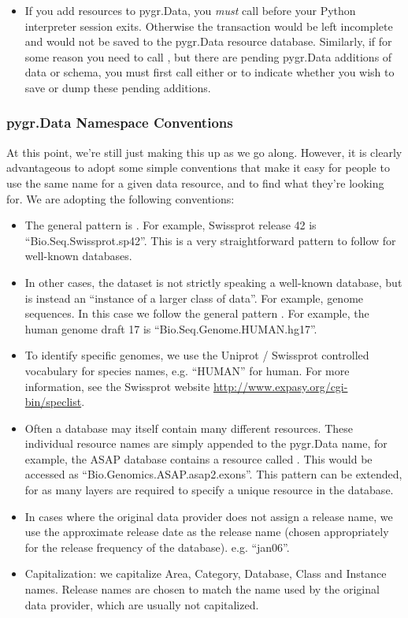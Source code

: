 \documentclass{howto}
\begin{document}
\begin{itemize}
\item If you add resources to pygr.Data, you {\em must} call 
before your Python interpreter session exits.  Otherwise the transaction would
be left incomplete and would not be saved to the pygr.Data resource database.
Similarly, if for some reason you need to call , 
but there are pending pygr.Data additions of data or schema, you must
first call either  or 
to indicate whether you wish to save or dump these pending additions.

\end{itemize}

\subsubsection{pygr.Data Namespace Conventions}
At this point, we're still just making this up as we go along.
However, it is clearly advantageous to adopt some simple conventions
that make it easy for people to use the same name for a given data resource,
and to find what they're looking for.  We are adopting the following conventions:
\begin{itemize}
\item The general pattern is .  For example,
Swissprot release 42 is ``Bio.Seq.Swissprot.sp42''.  This is a very straightforward
pattern to follow for well-known databases.
\item In other cases, the dataset is not strictly speaking a well-known database,
but is instead an ``instance of a larger class of data''.  For example, genome
sequences.  In this case we follow the general pattern 
.  For example, the human genome draft
17 is ``Bio.Seq.Genome.HUMAN.hg17''.  
\item To identify specific genomes, we use the Uniprot / Swissprot 
controlled vocabulary for species names, e.g. ``HUMAN'' for human.  For more
information, see the Swissprot website
\url{http://www.expasy.org/cgi-bin/speclist}.
\item  Often a database may itself contain many different resources.  These
individual resource names are simply appended to the pygr.Data name, for example,
the ASAP database contains a resource called .  This would be 
accessed as ``Bio.Genomics.ASAP.asap2.exons''.  This pattern can be extended,
for as many layers are required to specify a unique resource in the database.
\item In cases where the original data provider does not assign a release name, 
we use the approximate release date as the release name (chosen appropriately
for the release frequency of the database).  e.g. ``jan06''.
\item Capitalization: we capitalize Area, Category, Database, Class and Instance
names.  Release names are chosen to match the name used by the original data 
provider, which are usually not capitalized.
\end{itemize}
\end{document}
